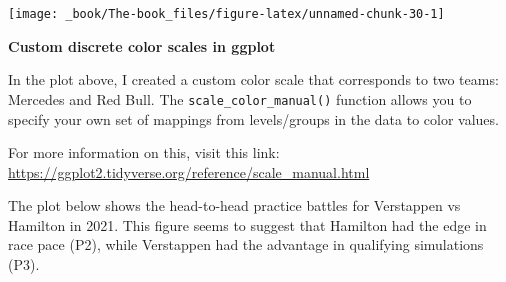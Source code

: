 \documentclass[
]{book}
\begin{document}
\begin{center}\texttt{[image: \_book/The-book\_files/figure-latex/unnamed-chunk-30-1]} \end{center}

\begin{blackbox}

\begin{center}
\textbf{Custom discrete color scales in ggplot}

\end{center}

In the plot above, I created a custom color scale that corresponds to two teams: Mercedes and Red Bull. The \texttt{scale\_color\_manual()} function allows you to specify your own set of mappings from levels/groups in the data to color values.

For more information on this, visit this link: \url{https://ggplot2.tidyverse.org/reference/scale_manual.html}

\end{blackbox}

The plot below shows the head-to-head practice battles for Verstappen vs Hamilton in 2021. This figure seems to suggest that Hamilton had the edge in race pace (P2), while Verstappen had the advantage in qualifying simulations (P3).
\end{document}
